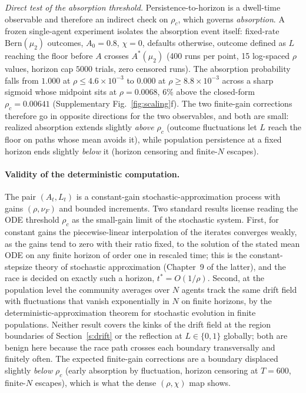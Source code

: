 \documentclass[11pt]{article}
\newcommand{\1}{\mathbf{1}}
\newcommand{\Astar}{A^{*}}
\begin{document}
\emph{Direct test of the absorption threshold.} Persistence-to-horizon is a dwell-time observable and therefore an indirect check on $\rho_c$, which governs \emph{absorption}. A frozen single-agent experiment isolates the absorption event itself: fixed-rate $\mathrm{Bern}(\mu_2)$ outcomes, $A_0=0.8$, $\chi=0$, defaults otherwise, outcome defined as $L$ reaching the floor before $A$ crosses $\Astar(\mu_2)$ (400 runs per point, 15 log-spaced $\rho$ values, horizon cap $5000$ trials, zero censored runs). The absorption probability falls from $1.000$ at $\rho\le4.6\times10^{-3}$ to $0.000$ at $\rho\ge8.8\times10^{-3}$ across a sharp sigmoid whose midpoint sits at $\rho=0.0068$, $6\%$ above the closed-form $\rho_c=0.00641$ (Supplementary Fig.~\ref{fig:scaling}f). The two finite-gain corrections therefore go in opposite directions for the two observables, and both are small: realized absorption extends slightly \emph{above} $\rho_c$ (outcome fluctuations let $L$ reach the floor on paths whose mean avoids it), while population persistence at a fixed horizon ends slightly \emph{below} it (horizon censoring and finite-$N$ escapes).

\paragraph{Validity of the deterministic computation.} The pair $(A_t,L_t)$ is a
constant-gain stochastic-approximation process with gains $(\rho,\nu_F)$ and bounded
increments. Two standard results license reading the ODE threshold $\rho_c$ as the
small-gain limit of the stochastic system. First, for constant gains the piecewise-linear
interpolation of the iterates converges weakly, as the gains tend to zero with their ratio
fixed, to the solution of the stated mean ODE on any finite horizon of order one in rescaled
time; this is the constant-stepsize theory of stochastic
approximation\cite{KushnerYin2003,Borkar2008} (Chapter~9 of the latter), and the race is
decided on exactly such a horizon, $t^\ast=O(1/\rho)$. Second, at the population level the
community averages over $N$ agents track the same drift field with fluctuations that vanish
exponentially in $N$ on finite horizons, by the deterministic-approximation theorem for
stochastic evolution in finite populations\cite{BenaimWeibull2003}. Neither result covers
the kinks of the drift field at the region boundaries of Section~\ref{s:drift} or the
reflection at $L\in\{0,1\}$ globally; both are benign here because the race path crosses
each boundary transversally and finitely often. The expected finite-gain corrections are a
boundary displaced slightly \emph{below} $\rho_c$ (early absorption by fluctuation, horizon
censoring at $T=600$, finite-$N$ escapes), which is what the dense $(\rho,\chi)$ map shows.
\end{document}
